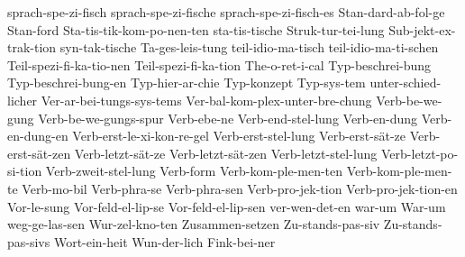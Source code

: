 {sprach-spe-zi-fisch
sprach-spe-zi-fische
sprach-spe-zi-fisch-es
             Stan-dard-ab-fol-ge
Stan-ford
Sta-tis-tik-kom-po-nen-ten
sta-tis-tische
Struk-tur-tei-lung
Sub-jekt-ex-trak-tion
             syn-tak-tische
Ta-ges-leis-tung
teil-idio-ma-tisch
teil-idio-ma-ti-schen
             Teil-spezi-fi-ka-tio-nen
             Teil-spezi-fi-ka-tion
The-o-ret-i-cal
             Typ-beschrei-bung
             Typ-beschrei-bung-en
             Typ-hier-ar-chie
             Typ-konzept
             Typ-sys-tem
	     unter-schied-licher
Ver-ar-bei-tungs-sys-tems
             Ver-bal-kom-plex-unter-bre-chung
Verb-be-we-gung
Verb-be-we-gungs-spur
Verb-ebe-ne
             Verb-end-stel-lung
             Verb-en-dung
             Verb-en-dung-en
Verb-erst-le-xi-kon-re-gel
	     Verb-erst-stel-lung
Verb-erst-sät-ze
Verb-erst-sät-zen
Verb-letzt-sät-ze
Verb-letzt-sät-zen
Verb-letzt-stel-lung
Verb-letzt-po-si-tion
	     Verb-zweit-stel-lung
             Verb-form
             Verb-kom-ple-men-ten
             Verb-kom-ple-men-te
Verb-mo-bil
             Verb-phra-se
             Verb-phra-sen
Verb-pro-jek-tion
Verb-pro-jek-tion-en
             Vor-le-sung
             Vor-feld-el-lip-se
             Vor-feld-el-lip-sen
	     ver-wen-det-en
             war-um
             War-um
weg-ge-las-sen
             Wur-zel-kno-ten
             Zusammen-setzen
             Zu-stands-pas-siv
             Zu-stands-pas-sivs
Wort-ein-heit
Wun-der-lich
Fink-bei-ner
}

